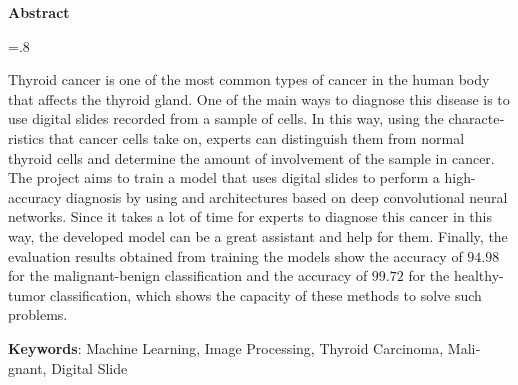 

\pagestyle{empty}

\begin{latin}

    \begin{center}
        \textbf{Abstract}
    \end{center}
    \baselineskip=.8\baselineskip

    Thyroid cancer is one of the most common types of cancer in the human body that affects the thyroid gland.
    One of the main ways to diagnose this disease is to use digital slides recorded from a sample of cells.
    In this way, using the characteristics that cancer cells take on, experts can distinguish them from normal thyroid cells and determine the amount of involvement of the sample in cancer.
    The project aims to train a model that uses digital slides to perform a high-accuracy diagnosis by using  and  architectures based on deep convolutional neural networks. Since it takes a lot of time for experts to diagnose this cancer in this way, the developed model can be a great assistant and help for them.
    Finally, the evaluation results obtained from training the models show the accuracy of $94.98$ for the malignant-benign classification and the accuracy of $99.72$ for the healthy-tumor classification, which shows the capacity of these methods to solve such problems.



    \bigskip\noindent\textbf{Keywords}:
    Machine Learning, Image Processing, Thyroid Carcinoma, Malignant, Digital Slide

\end{latin}

\newpage
